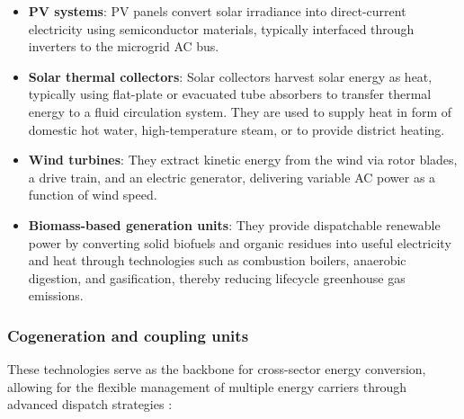 \documentclass[12pt,a4paper]{report}
\begin{document}
\begin{itemize}
    \item \textbf{PV systems}: PV panels convert solar irradiance into direct-current electricity using semiconductor materials, typically interfaced through inverters to the microgrid AC bus. 
    \item \textbf{Solar thermal collectors}: Solar collectors harvest solar energy as heat, typically using flat-plate or evacuated tube absorbers to transfer thermal energy to a fluid circulation system. They are used to supply heat in form of domestic hot water, high-temperature steam, or to provide district heating.
    \item \textbf{Wind turbines}: They extract kinetic energy from the wind via rotor blades, a drive train, and an electric generator, delivering variable AC power as a function of wind speed. 
    \item \textbf{Biomass-based generation units}: They provide dispatchable renewable power by converting solid biofuels and organic residues into useful electricity and heat through technologies such as combustion boilers, anaerobic digestion, and gasification, thereby reducing lifecycle greenhouse gas emissions. 
\end{itemize}

\subsubsection{Cogeneration and coupling units}
These technologies serve as the backbone for cross-sector energy conversion, allowing for the flexible management of multiple energy carriers through advanced dispatch strategies \cite{abbasianhamedani2026minireview}:
\end{document}
